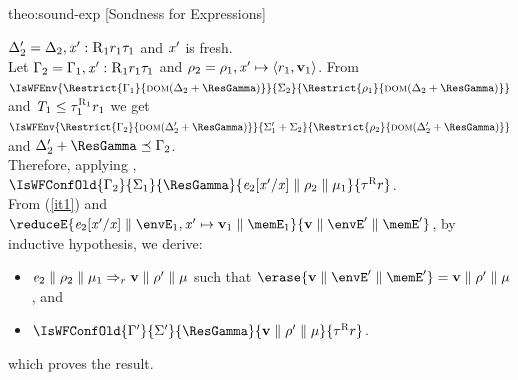 \begin{proofOf}{theo:sound-exp} [Sondness for Expressions]
\begin{description}
$\Delta'_2=\Delta_2,\mathit{x}' :\textsc{R}_1{r_1}{\tau_1}$ and $\mathit{x}'$ is fresh.\\
%
%
Let $\Gamma_2=\Gamma_1,\mathit{x}' :\textsc{R}_1{r_1}{\tau_1}$ and $\rho_2=\rho_1,\mathit{x}'\mapsto\langle {r_1},{\mathbf{v}_1} \rangle$. From $\IsWFEnv{\Restrict{{\Gamma_1}}{\dom{\Delta_2\ctxsum\ResGamma}}}{\Sigma_2}{\Restrict{{\env_1}}{\dom{\Delta_2\ctxsum\ResGamma}}}$ and $\mathit{T}_1\leq\tau_1^{\textsc{R}_1}{r_1}$ we get  $\IsWFEnv{\Restrict{{\Gamma_2}}{\dom{\Delta'_2\ctxsum\ResGamma}}}{\Sigma'_1\ctxsum\Sigma_2}{\Restrict{{\env_2}}{\dom{\Delta'_2\ctxsum\ResGamma}}}$ and $\Delta'_2\ctxsum\ResGamma\ctxord\Gamma_2$.\\
%
Therefore, applying , $\IsWFConfOld{\Gamma_2}{\Sigma_1}{\ResGamma}{\Conf{\Subst{\e_2}{\x'}{\x}}{\env_2}{\mem_1}}{\Graded{\tau}{\Rgr}{\rgr}}$. \\
%
From (\ref{it1}) and $\reduceE{{\Conf{\Subst{\e_2}{\x'}{\x}}{{\envE_1},\x'\mapsto\val_1}{\memE_1}}}{{\Conf{\val}{\envE'}{\memE'}}}$, by inductive hypothesis, we derive:
\begin{itemize}
\item \label{it1} $\mathit{e}_2\parallel\rho_2\parallel\mu_1\Rightarrow_{r}\mathbf{v}\parallel\rho'\parallel\mu$ such that $\erase{\Conf{\val}{\envE'}{\memE'}}=\Conf{\val}{\env'}{\mem}$, and 
\item \label{it2} $\IsWFConfOld{\Gamma'}{\Sigma'}{\ResGamma}{\Conf{\val}{\env'}{\mem}}{\Graded{\tau}{\Rgr}{\rgr}}$. %
\end{itemize}
which  proves the result.

\bigskip
{}


\item [Case $\e={\FieldAccess{\x}{\f_k}}$]\


\end{description}
\end{proofOf}
